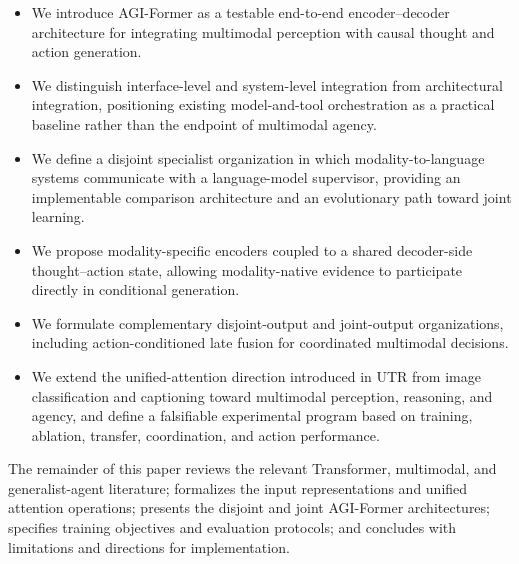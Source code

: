 \begin{itemize}
    \item We introduce AGI-Former as a testable end-to-end encoder--decoder architecture for integrating multimodal perception with causal thought and action generation.
    \item We distinguish interface-level and system-level integration from architectural integration, positioning existing model-and-tool orchestration as a practical baseline rather than the endpoint of multimodal agency.
    \item We define a disjoint specialist organization in which modality-to-language systems communicate with a language-model supervisor, providing an implementable comparison architecture and an evolutionary path toward joint learning.
    \item We propose modality-specific encoders coupled to a shared decoder-side thought--action state, allowing modality-native evidence to participate directly in conditional generation.
    \item We formulate complementary disjoint-output and joint-output organizations, including action-conditioned late fusion for coordinated multimodal decisions.
    \item We extend the unified-attention direction introduced in UTR from image classification and captioning toward multimodal perception, reasoning, and agency, and define a falsifiable experimental program based on training, ablation, transfer, coordination, and action performance.
\end{itemize}

The remainder of this paper reviews the relevant Transformer, multimodal, and generalist-agent literature; formalizes the input representations and unified attention operations; presents the disjoint and joint AGI-Former architectures; specifies training objectives and evaluation protocols; and concludes with limitations and directions for implementation.
